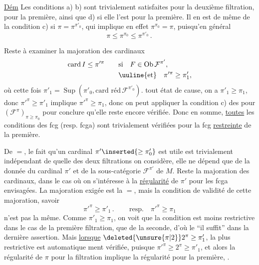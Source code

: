 \uline{Dém} Les conditions a) b) sont trivialement
satisfaites pour la deuxième filtration,
   pour la première,
ainsi que d) si elle l'est pour la première.
Il en est de même de la condition
c) si $\pi=\pi^{\pi'_0}$, qui implique en effet
$\pi^{\pi_0}=\pi$, puisqu'en général
\[
\pi\leq\pi^{\pi_0}\leq\pi^{\pi'_0}\mathpunct{.}
\]

Reste à examiner la majoration des
cardinaux
\[
\begin{aligned}
\operatorname{card} I\leq\pi'^{\pi}\qquad &\text{si}\quad F\in\operatorname{Ob}\mathcal F^{\pi'},\\
&\text{\uuline{et}}\quad\pi'^{\pi}\geq\pi'_1,
\end{aligned}
\]
où cette fois $\pi'_1=\operatorname{Sup}(\pi'_0,\text{card réd}\,\mathcal F^{\pi'_0})$. 
 tout état de cause, on a $\pi'_1\geq\pi_1$, donc
$\pi'^{\pi}\geq\pi'_1$ implique $\pi'^{\pi}\geq\pi_1$, donc on peut appliquer
la condition c) des  pour $(\mathcal F^\pi)_{\pi\geq\pi_0}$ pour
conclure qu'elle reste encore vérifiée. Donc
en somme, \uline{toutes} les conditions des fcg
(resp. fcga) sont trivialement vérifiées pour
la fcg \uline{restreinte} de la première.

De $=$, le fait qu'un cardinal $\pi'\inserted{\geq\pi'_0}$ est
utile  est trivialement indépendant de
quelle des deux filtrations on considère,
elle ne dépend que de la donnée du
cardinal $\pi'$ et de la sous-catégorie $\mathcal F^{\pi'}$
de $M$. Reste la majoration des cardinaux, dans le cas où on s'intéresse à
la \uline{régularité} de $\pi'$ pour les  fcga
envisagées. La majoration exigée est
la $=$, mais la condition  de
validité de cette majoration, savoir
\[
\pi'^{\pi}\geq\pi'_1\mathpunct{.}\qquad\text{resp.}\quad\pi'^{\pi}\geq\pi_1
\]
n'est pas la même. Comme $\pi'_1\geq\pi_1$,
on voit que la condition  est
moins restrictive dans le cas de la
première filtration, que de la seconde, d'où
le ``il suffit'' dans la dernière assertion. Mais
\uline{lorsque} $\deleted{\unsure{\pi|2}}2^\pi\geq\pi'_1$,  la plus restrictive est automatique%
%
ment vérifiée, puisque $\pi'^\pi\geq2^\pi\geq\pi'_1$, et alors
la  régularité de $\pi$ pour la 
filtration implique la régularité pour la
première, .

